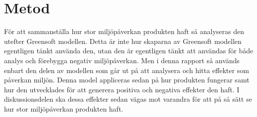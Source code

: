 \section{Metod}
\label{sec:joel_a-method}

För att sammanställa hur stor miljöpåverkan produkten haft så analyseras den utefter Greensoft modellen. Detta är inte hur skaparna av Greensoft modellen egentligen tänkt använda den, utan den är egentligen tänkt att användas för både analys och förebygga negativ miljöpåverkan. Men i denna rapport så används enbart den delen av modellen som går ut på att analysera och hitta effekter som påverkan miljön. Denna model appliceras sedan på hur produkten fungerar samt hur den utvecklades för att generera positiva och negativa effekter den haft. I diskussionsdelen ska dessa effekter sedan vägas mot varandra för att på så sätt se hur stor miljöpåverkan produkten haft.